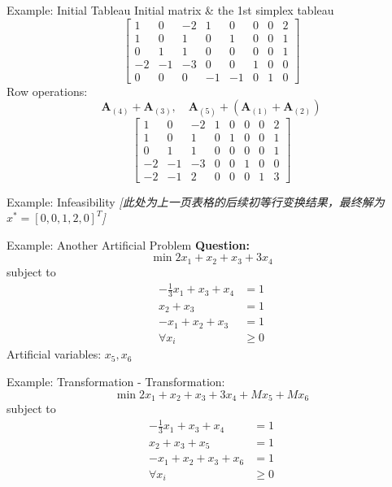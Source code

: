 \documentclass[aspectratio=169,hyperref,UTF8,CJK]{beamer}
\begin{document}
\begin{frame}{Example: Initial Tableau}
Initial matrix \& the 1st simplex tableau
\[
\begin{bmatrix}
1 & 0 & -2 & 1 & 0 & 0 & 0 & 2 \\
1 & 0 & 1 & 0 & 1 & 0 & 0 & 1 \\
0 & 1 & 1 & 0 & 0 & 0 & 0 & 1 \\
-2 & -1 & -3 & 0 & 0 & 1 & 0 & 0 \\
0 & 0 & 0 & -1 & -1 & 0 & 1 & 0
\end{bmatrix}
\]
Row operations:
\[
\mathbf{A}_{(4)} + \mathbf{A}_{(3)}, \quad \mathbf{A}_{(5)} + (\mathbf{A}_{(1)} + \mathbf{A}_{(2)})
\]
\[
\begin{bmatrix}
1 & 0 & -2 & 1 & 0 & 0 & 0 & 2 \\
1 & 0 & 1 & 0 & 1 & 0 & 0 & 1 \\
0 & 1 & 1 & 0 & 0 & 0 & 0 & 1 \\
-2 & -1 & -3 & 0 & 0 & 1 & 0 & 0 \\
-2 & -1 & 2 & 0 & 0 & 0 & 1 & 3
\end{bmatrix}
\]
\end{frame}

\begin{frame}{Example: Infeasibility}
\textit{[此处为上一页表格的后续初等行变换结果，最终解为} \(x^*=[0,0,1,2,0]^T\)\textit{]}
\end{frame}

\begin{frame}{Example: Another Artificial Problem}
\textbf{Question:}
\[
\min 2x_1 + x_2 + x_3 + 3x_4
\]
subject to
\begin{align*}
-\frac{1}{3}x_1 + x_3 + x_4 &= 1 \\
x_2 + x_3 &= 1 \\
-x_1 + x_2 + x_3 &= 1 \\
\forall x_i &\geq 0
\end{align*}
Artificial variables: \(x_5, x_6\)
\end{frame}

\begin{frame}{Example: Transformation}
- Transformation:
\[
\min 2x_1 + x_2 + x_3 + 3x_4 + Mx_5 + Mx_6
\]
subject to
\begin{align*}
-\frac{1}{3}x_1 + x_3 + x_4 &= 1 \\
x_2 + x_3 + x_5 &= 1 \\
-x_1 + x_2 + x_3 + x_6 &= 1 \\
\forall x_i &\geq 0
\end{align*}
\end{frame}
\end{document}
